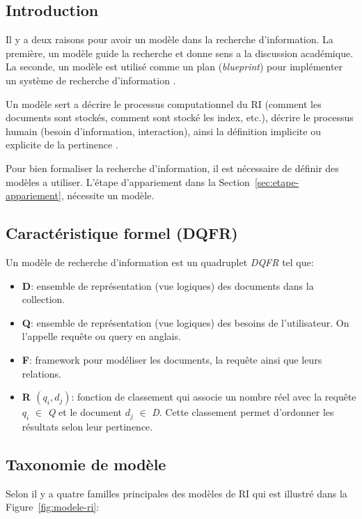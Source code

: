 \subsection{Introduction}
Il y a deux raisons pour avoir un modèle dans la recherche d'information. La première, un modèle guide la recherche et donne sens a la discussion académique. La seconde, un modèle est utilisé comme un plan (\emph{blueprint}) pour implémenter un système de recherche d'information \citep{model-ir}.

Un modèle sert a décrire le processus computationnel du RI (comment les documents sont stockés, comment sont stocké les index, etc.), décrire le processus humain (besoin d'information, interaction), ainsi la définition implicite ou explicite de la pertinence \citep{model-ri-cours}.

Pour bien formaliser la recherche d'information, il est nécessaire de définir des modèles a utiliser. L'étape d’appariement dans la Section~\ref{sec:etape-appariement}, nécessite un modèle.

\subsection{Caractéristique formel (DQFR)}
\begin{definition}
    Un modèle de recherche d'information est un quadruplet \emph{DQFR} \citep*{modern-ir, vsm} tel que:
    \begin{itemize}
        \item \textbf{D}: ensemble de représentation (vue logiques) des documents dans la collection.
        \item \textbf{Q}: ensemble de représentation (vue logiques) des besoins de l'utilisateur. On l'appelle requête ou query en anglais.
        \item \textbf{F}: framework pour modéliser les documents, la requête ainsi que leurs relations.
        \item \textbf{R $(q_{i}, d_{j})$}: fonction de classement qui associe un nombre réel avec la requête $q_{i}$ $\in$ \textit{Q} et le document $d_{j}$ $\in$ \textit{D}. Cette classement permet d'ordonner les résultats selon leur pertinence.
    \end{itemize}
\end{definition}

\subsection{Taxonomie de modèle}
Selon \citeauthor{modern-ir} il y a quatre familles principales des modèles de RI qui est illustré dans la Figure~\ref{fig:modele-ri}:

